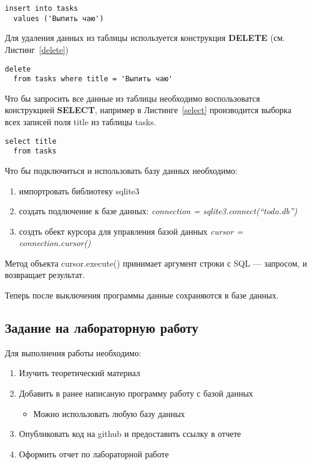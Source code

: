 \documentclass[a4paper]{article}
\begin{document}
\begin{lstlisting}[label=insert,caption=Добавление новой записи]
  insert into tasks
  values ('Выпить чаю')
\end{lstlisting}

Для удаления данных из таблицы используется конструкция \textbf{DELETE} (см. Листинг~\ref{delete})

\begin{lstlisting}[label=delete,caption=Создание таблицы]
  delete
  from tasks where title = 'Выпить чаю'
\end{lstlisting}

Что бы запросить все данные из таблицы необходимо воспользоватся конструкцией \textbf{SELECT}, например в Листинге~\ref{select} производится выборка всех записей поля title из таблицы tasks.

\begin{lstlisting}[label=select,caption=Выборка данных]
  select title
  from tasks
\end{lstlisting}

Что бы подключиться и использовать базу данных необходимо:
\begin{enumerate}
  \item импортровать библиотеку sqlite3
  \item создать подлючение к базе данных: \textit{connection = sqlite3.connect(``todo.db'')}
  \item создть обект курсора для управления базой данных \textit{cursor = connection.cursor()}
\end{enumerate}

Метод объекта \textsf{cursor.execute()} принимает аргумент строки с SQL --- запросом, и возвращает результат.



Теперь после выключения программы данные сохраняются в базе данных.

\newpage
\subsection{Задание на лабораторную работу}

Для выполнения работы необходимо:
\begin{enumerate}
  \item Изучить теоретический материал
  \item Добавить в ранее написаную программу работу с базой данных
    \begin{itemize}
      \item Можно использовать любую базу данных
    \end{itemize}
  \item Опубликовать код на github и предоставить ссылку в отчете
  \item Оформить отчет по лабораторной работе
\end{enumerate}
\end{document}
